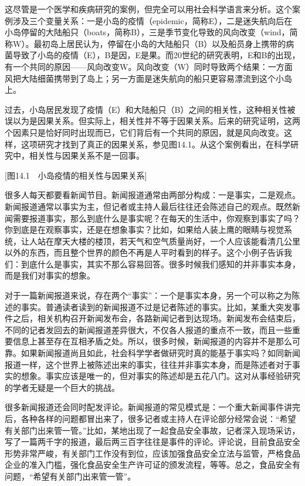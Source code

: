 这尽管是一个医学和疾病研究的案例，但完全可以用社会科学语言来分析。这个案例涉及三个变量关系：一是小岛的疫情（epidemic，简称E），二是迷失航向后在小岛停留的大陆船只（boats，简称B），三是季节变化导致的风向改变（wind，简称W）。最初岛上居民认为，停留在小岛的大陆船只（B）以及船员身上携带的病菌导致了小岛的疫情（E），B是因，E是果。而20世纪的研究表明，E和B的出现，有一个共同的原因——风向改变W。风向改变（W）同时导致两个结果：一方面风把大陆细菌携带到了岛上；另一方面是迷失航向的船只更容易漂流到这个小岛上。

过去，小岛居民发现了疫情（E）和大陆船只（B）之间的相关性，这种相关性被误以为是因果关系。但实际上，相关性并不等于因果关系。后来的研究证明，这两个因素只是恰好同时出现而已，它们背后有一个共同的原因，就是风向改变。这样，这项研究才找到了真正的因果关系，参见图14.1。从这个案例看出，在科学研究中，相关性与因果关系不是一回事。

[图14.1　小岛疫情的相关性与因果关系]


很多人每天都要看新闻节目。新闻报道通常由两部分构成：一是事实，二是观点。新闻报道通常以事实为主，但记者或主持人最后往往还会陈述自己的观点。既然新闻需要报道事实，那么到底什么是事实呢？在每天的生活中，你观察到事实了吗？你到底是在观察事实，还是在想象事实？比如，如果给人装上鹰的眼睛与视觉系统，让人站在摩天大楼的楼顶，若天气和空气质量尚好，一个人应该能看清几公里以外的东西，而且整个世界的颜色不再是人平时看到的样子。这个小例子告诉我们：到底什么是事实，其实不那么容易回答。很多时候我们感知的并非事实本身，而是我们对事实的想象。

对于一篇新闻报道来说，存在两个“事实”：一个是事实本身，另一个可以称之为陈述的事实。普通读者读到的新闻报道不过是记者陈述的事实。比如，某重大突发事件之后，相关机构召开新闻发布会，各路新闻记者到达现场。新闻发布会结束后，不同的记者发回去的新闻报道差异很大，不仅各人报道的重点不一致，而且一些重要信息上甚至存在互相矛盾之处。所以，很多时候，新闻报道的内容并不是那么可靠。如果新闻报道尚且如此，社会科学学者做研究时真的能基于事实吗？如同新闻报道一样，这个世界上被陈述出来的事实，往往并非事实本身，而是陈述者对于事实的想象。事实应该是唯一的，但对事实的陈述却是五花八门。这对从事经验研究的学者无疑是一个巨大的挑战。

很多新闻报道还会同时配发评论。新闻报道的常见模式是：一个重大新闻事件讲完后，各种各样的问题都冒出来了，很多记者或主持人在评论部分经常会说：“希望有关部门出来管一管。”比如，某地出现了一起食品安全事故，记者深入现场采访，写了一篇两千字的报道，最后两三百字往往是事件的评论。评论说，目前食品安全形势非常严峻，有关部门工作没有到位，应该加强食品安全立法与监管，严格食品企业的准入门槛，强化食品安全生产许可证的颁发流程，等等。总之，食品安全有问题，“希望有关部门出来管一管”。

